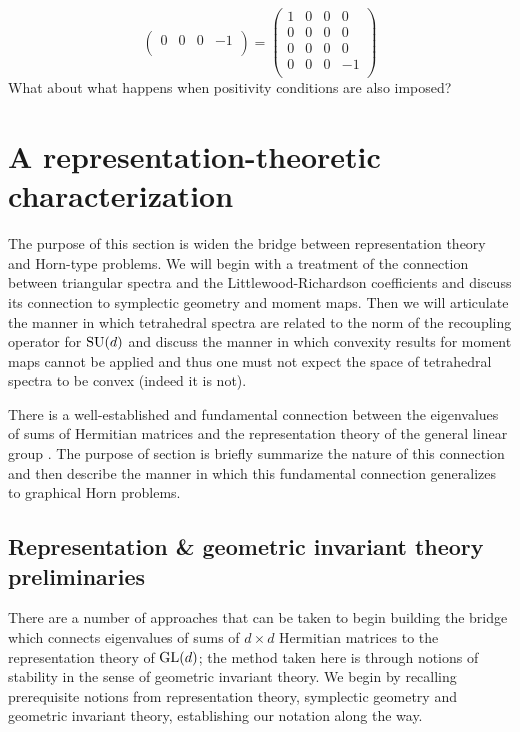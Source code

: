\documentclass[notitlepage, 10pt]{article}
\begin{document}
\begin{rem}
{\begin{equation}
\begin{pmatrix}
                0 & 0 & 0 & -1 \\
            \end{pmatrix}
            =
            \begin{pmatrix}
                1 & 0 & 0 & 0 \\
                0 & 0 & 0 & 0 \\
                0 & 0 & 0 & 0 \\
                0 & 0 & 0 & -1 \\
            \end{pmatrix}
        \end{equation}
    What about what happens when positivity conditions are also imposed?
    }
\end{rem}

\clearpage
\section{A representation-theoretic characterization}
{\color{blue}
    The purpose of this section is widen the bridge between representation theory and Horn-type problems.
    We will begin with a treatment of the connection between triangular spectra and the Littlewood-Richardson coefficients and discuss its connection to symplectic geometry and moment maps.
    Then we will articulate the manner in which tetrahedral spectra are related to the norm of the recoupling operator for $\operatorname{SU}(d)$ and discuss the manner in which convexity results for moment maps cannot be applied and thus one must not expect the space of tetrahedral spectra to be convex (indeed it is not).
}

There is a well-established and fundamental connection between the eigenvalues of sums of Hermitian matrices and the representation theory of the general linear group \cite{klyachko1998stable,knutson1999honeycomb,knutson2000symplectic,fulton2000eigenvalues,bhatia2001linear,christandl2008quantum,berline2018horn}.
The purpose of section is briefly summarize the nature of this connection and then describe the manner in which this fundamental connection generalizes to graphical Horn problems.

\subsection{Representation \& geometric invariant theory preliminaries}
\label{sec:prelim}

There are a number of approaches that can be taken to begin building the bridge which connects eigenvalues of sums of $d\times d$ Hermitian matrices to the representation theory of $\operatorname{GL}(d)$; the method taken here is through notions of stability in the sense of geometric invariant theory.
We begin by recalling prerequisite notions from representation theory, symplectic geometry and geometric invariant theory, establishing our notation along the way.
\end{document}

